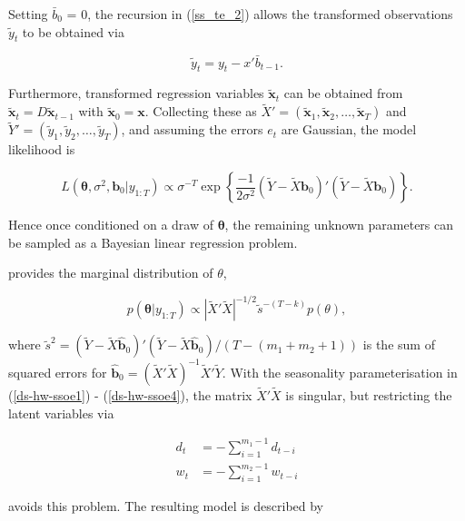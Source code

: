 \documentclass[12pt,a4paper]{article}%
\numberwithin{equation}{section}
\begin{document}
Setting $\bar{b}_0$ = 0, the recursion in (\ref{ss_te_2}) allows the transformed observations $\tilde{y}_t$ to be obtained via

\begin{equation}
\tilde{y}_t = y_t - x'\bar{b}_{t-1} \label{ss_rp_y}.
\end{equation}

Furthermore, transformed regression variables $\tilde{\textbf{x}}_t$ can be obtained from $\tilde{\textbf{x}}_t = D\tilde{\textbf{x}}_{t-1}$ with $\tilde{\textbf{x}}_0 = \textbf{x}$. Collecting these as $\widetilde{X}' = (\tilde{\textbf{x}}_1, \tilde{\textbf{x}}_2, \dots, \tilde{\textbf{x}}_T)$ and $\widetilde{Y}' = (\tilde{y}_1, \tilde{y}_2, \dots, \tilde{y}_T)$, and assuming the errors $e_t$ are Gaussian, the model likelihood is

\begin{equation}
L(\boldsymbol{\theta}, \sigma^2, \boldsymbol{b}_0 | y_{1:T}) \propto \sigma^{-T} \exp \left\{ \frac{-1}{2\sigma^2}(\widetilde{Y} - \widetilde{X}\boldsymbol{b}_0)'(\widetilde{Y} - \widetilde{X}\boldsymbol{b}_0) \right\}.
\end{equation}

Hence once conditioned on a draw of $\boldsymbol{\theta}$, the remaining unknown parameters can be sampled as a Bayesian linear regression problem.

\citet{Forbes2000} provides the marginal distribution of $\theta$,

\begin{equation}
\label{exp-sm-marginal}
p(\boldsymbol{\theta} | y_{1:T}) \propto \left| \widetilde{X}' \widetilde{X} \right|^{-1/2} \tilde{s}^{-(T-k)} p(\theta),
\end{equation}

where $\tilde{s}^2 = (\widetilde{Y} - \widetilde{X}\hat{\boldsymbol{b}}_0)'(\widetilde{Y} - \widetilde{X}\hat{\boldsymbol{b}}_0) / (T - (m_1 + m_2 + 1))$ is the sum of squared errors for $\hat{\boldsymbol{b}}_0 = (\widetilde{X}'\widetilde{X})^{-1}\widetilde{X}'\widetilde{Y}$.
With the seasonality parameterisation in (\ref{ds-hw-ssoe1}) - (\ref{ds-hw-ssoe4}), the matrix $\widetilde{X}' \widetilde{X}$ is singular, but restricting the latent variables via

\begin{align}
d_t &= - \sum_{i=1}^{m_1-1} d_{t-i} \\
w_t &= - \sum_{i=1}^{m_2-1} w_{t-i}
\end{align}

avoids this problem. The resulting model is described by
\end{document}

